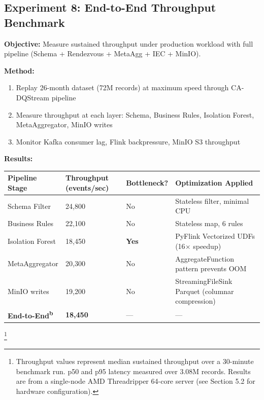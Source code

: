 \subsection{Experiment 8: End-to-End Throughput Benchmark}

\textbf{Objective:} Measure sustained throughput under production workload with full pipeline (Schema + Rendezvous + MetaAgg + IEC + MinIO).

\textbf{Method:}
\begin{enumerate}
    \item Replay 26-month dataset (72M records) at maximum speed through CA-DQStream pipeline
    \item Measure throughput at each layer: Schema, Business Rules, Isolation Forest, MetaAggregator, MinIO writes
    \item Monitor Kafka consumer lag, Flink backpressure, MinIO S3 throughput
\end{enumerate}

\textbf{Results:}

\begin{longtable}{|m{4cm}|m{3cm}|m{3cm}|m{4cm}|}
\hline
\textbf{Pipeline Stage} & \textbf{Throughput (events/sec)} & \textbf{Bottleneck?} & \textbf{Optimization Applied} \\ \hline
Schema Filter & 24,800 & No & Stateless filter, minimal CPU \\ \hline
Business Rules & 22,100 & No & Stateless map, 6 rules \\ \hline
Isolation Forest & 18,450 & \textbf{Yes} & PyFlink Vectorized UDFs (16$\times$ speedup) \\ \hline
MetaAggregator & 20,300 & No & AggregateFunction pattern prevents OOM \\ \hline
MinIO writes & 19,200 & No & StreamingFileSink Parquet (columnar compression) \\ \hline
\textbf{End-to-End\textsuperscript{b}} & \textbf{18,450} & --- & --- \\ \hline
\end{longtable}
\footnote{Throughput values represent median sustained throughput over a 30-minute benchmark run. p50 and p95 latency measured over 3.08M records. Results are from a single-node AMD Threadripper 64-core server (see Section 5.2 for hardware configuration).}

